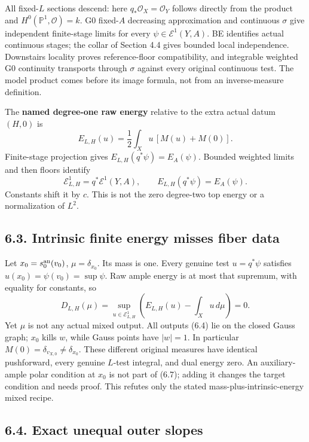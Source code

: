 \documentclass[
  10pt,
]{article}
\begin{document}
All fixed-\(L\) sections descend: here \(q_*\mathcal O_X=\mathcal O_Y\)
follows directly from the product and \(H^0(\mathbb P^1,\mathcal O)=k\).
G0 fixed-\(A\) decreasing approximation and continuous \(\sigma\) give
independent finite-stage limits for every \(\psi\in\mathcal E^1(Y,A)\).
BE identifies actual continuous stages; the collar of Section 4.4 gives
bounded local independence. Downstairs locality proves reference-floor
compatibility, and integrable weighted G0 continuity transports through
\(\sigma\) against every original continuous test. The model product
comes before its image formula, not from an inverse-measure definition.

The \textbf{named degree-one raw energy} relative to the extra actual
datum \((H,0)\) is
\[E_{L,H}(u)=\frac12\int_X u\,[M(u)+M(0)]. \tag{6.5}\] Finite-stage
projection gives \(E_{L,H}(q^*\psi)=E_A(\psi)\). Bounded weighted limits
and then floors identify
\[\mathcal E^1_{L,H}=q^*\mathcal E^1(Y,A),\qquad
E_{L,H}(q^*\psi)=E_A(\psi). \tag{6.6}\] Constants shift it by \(c\).
This is not the zero degree-two top energy or a normalization of
\(L^2\).

\subsection{6.3. Intrinsic finite energy misses fiber
data}\label{intrinsic-finite-energy-misses-fiber-data}

Let \(x_0=s_0^{\rm an}(v_0)\), \(\mu=\delta_{x_0}\). Its mass is one.
Every genuine test \(u=q^*\psi\) satisfies
\(u(x_0)=\psi(v_0)=\sup\psi\). Raw ample energy is at most that
supremum, with equality for constants, so
\[D_{L,H}(\mu)=\sup_{u\in\mathcal E^1_{L,H}}
\left(E_{L,H}(u)-\int_Xu\,d\mu\right)=0. \tag{6.7}\] Yet \(\mu\) is not
any actual mixed output. All outputs (6.4) lie on the closed Gauss
graph; \(x_0\) kills \(w\), while Gauss points have \(|w|=1\). In
particular \(M(0)=\delta_{v_{X,0}}\ne\delta_{x_0}\). These different
original measures have identical pushforward, every genuine \(L\)-test
integral, and dual energy zero. An auxiliary-ample polar condition at
\(x_0\) is not part of (6.7); adding it changes the target condition and
needs proof. This refutes only the stated mass-plus-intrinsic-energy
mixed recipe.

\subsection{6.4. Exact unequal outer
slopes}\label{exact-unequal-outer-slopes}
\end{document}
